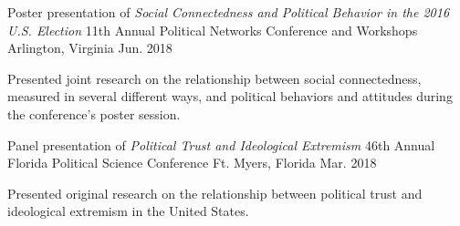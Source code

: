 

\begin{cventries}

\cventry
  {Poster presentation of \emph{Social Connectedness and Political Behavior in the 2016 U.S. Election}} %
  {11th Annual Political Networks Conference and Workshops} %
  {Arlington, Virginia} %
  {Jun. 2018} %
  {
    \begin{cvitems} %
      \item {Presented joint research on the relationship between social connectedness, measured in several different ways, and political behaviors and attitudes during the conference's poster session.}
    \end{cvitems}
  }

  \cventry
    {Panel presentation of \emph{Political Trust and Ideological Extremism}} %
    {46th Annual Florida Political Science Conference} %
    {Ft. Myers, Florida} %
    {Mar. 2018} %
    {
      \begin{cvitems} %
        \item {Presented original research on the relationship between political trust and ideological extremism in the United States.}
      \end{cvitems}
    }


\end{cventries}
